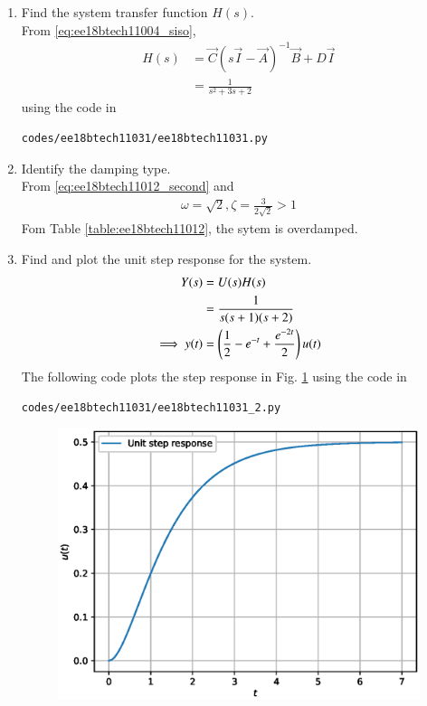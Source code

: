 \begin{enumerate}[label=\thesubsection.\arabic*.,ref=\thesubsection.\theenumi]
\item Find the system transfer function $H(s)$.
%
\\
\solution From \eqref{eq:ee18btech11004_siso},
%
\begin{align}
H(s) &=  \vec{C}{(s\vec{I}-\vec{A})^{-1}}\vec{B}+D\vec{I}
\\
&  = \frac{1}{s^{2}+3s+2}
\label{eq:ee18btech11031_H}
\end{align}
%
using the code in 
\begin{lstlisting}
codes/ee18btech11031/ee18btech11031.py
\end{lstlisting}
%
\item Identify the damping type.
\\
\solution From \eqref{eq:ee18btech11012_second} and \label{eq:ee18btech11031_H}
%
\begin{align}
\omega = \sqrt{2}, \zeta = \frac{3}{2\sqrt{2}} > 1
\end{align}
Fom Table \ref{table:ee18btech11012}, the sytem is overdamped.
%
\item Find and plot the unit step response for the system.
\\
\solution 
\begin{align}
Y(s) &= U(s)H(s)
\\
& = \frac{1}{s(s+1)(s+2)}
\\
\implies y(t) &= \left(\frac{1}{2} - e^{-t} + \frac{e^{-2t}}{2}\right)u(t)
\end{align}
%
The following code plots the step response in Fig.   \ref{fig:ee18btech11031}
%
using the code in 
\begin{lstlisting}
codes/ee18btech11031/ee18btech11031_2.py
\end{lstlisting}

\begin{figure}[!h]
\centering
  \includegraphics[width=\columnwidth]{./figs/ee18btech11031.eps}
  \caption{}
  \label{fig:ee18btech11031}
\end{figure}
%

\end{enumerate}
